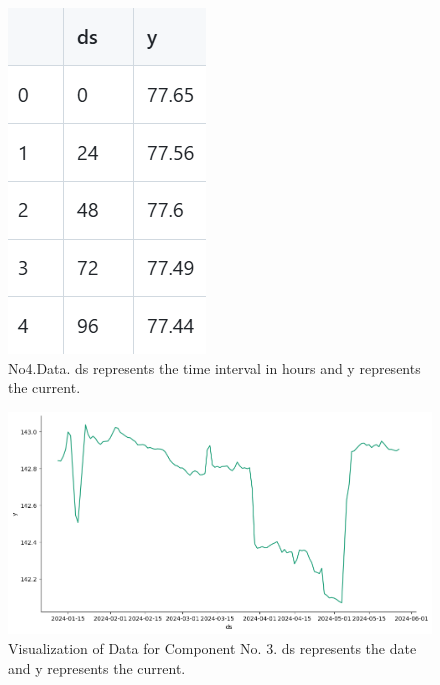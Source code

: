 \begin{figure}[H]
  \centering
     \includegraphics[width=\linewidth]{sec/No.4data.png} %

   \caption{No4.Data.
  ds represents the time interval in hours and y represents the current.}
   \label{fig:onecol}
\end{figure}

\begin{figure}[H]
  \centering
     \includegraphics[width=\linewidth]{sec/No.3data.png} %

   \caption{Visualization of Data for Component No. 3.
  ds represents the date and y represents the current.}
   \label{fig:onecol}
\end{figure}
